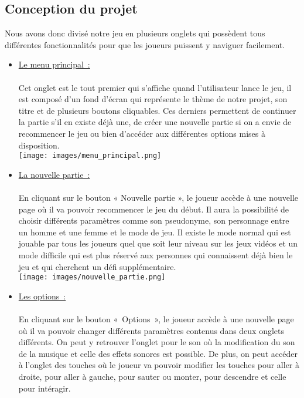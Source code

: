 \documentclass[12pt,a4paper]{article}
\begin{document}
        \subsection{Conception du projet}
            \tabto{1cm} Nous avons donc divisé notre jeu en plusieurs onglets qui possèdent tous différentes fonctionnalités pour que les joueurs puissent y naviguer facilement.\\

            \begin{itemize}
            
                \item \tabto{1cm} \underline{Le menu principal~:} \\\\
                \tabto{1cm} Cet onglet est le tout premier qui s’affiche quand l’utilisateur lance le jeu, il est composé d’un fond d’écran qui représente le thème de notre projet, son titre et de plusieurs boutons cliquables. Ces derniers permettent de continuer la partie s’il en existe déjà une, de créer une nouvelle partie si on a envie de recommencer le jeu ou bien d’accéder aux différentes options mises à disposition.\\

                \texttt{[image: images/menu\_principal.png]}\\
                
                \item \tabto{1cm} \underline{La nouvelle partie~:}\\\\
                \tabto{1cm} En cliquant sur le bouton « Nouvelle partie », le joueur accède à une
                nouvelle page où il va pouvoir recommencer le jeu du début. Il aura la possibilité de choisir différents paramètres comme son pseudonyme, son personnage entre un homme et une femme et le mode de jeu. Il existe le mode normal qui est jouable par tous les joueurs quel que soit leur niveau sur les jeux vidéos et un mode difficile qui est plus réservé aux personnes qui connaissent déjà bien le jeu et qui cherchent un défi supplémentaire.\\

                \texttt{[image: images/nouvelle\_partie.png]}\\

                \newpage

                \item \tabto{1cm} \underline{Les options~:}\\\\
                \tabto{1cm} En cliquant sur le bouton «~Options~», le joueur accède à une nouvelle page où il va pouvoir changer différents paramètres contenus dans deux onglets différents. On peut y retrouver l’onglet pour le son où la modification du son de la musique et celle des effets sonores est possible. De plus, on peut accéder à l’onglet des touches où le joueur va pouvoir modifier les touches pour aller à droite, pour aller à gauche, pour sauter ou monter, pour descendre et celle pour intéragir.\\


\end{itemize}
\end{document}
